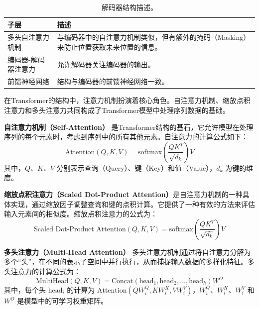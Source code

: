   \begin{table}[h!]
  \centering
  \small
  \begin{tabular}{lp{10cm}}
  \toprule
  \textbf{子层} & \textbf{描述} \\
  \midrule
  多头自注意力机制 & 与编码器中的自注意力机制类似，但有额外的掩码（Masking）来防止位置获取未来位置的信息。 \\
  \midrule
  编码器-解码器注意力 & 允许解码器关注编码器的输出。 \\
  \midrule
  前馈神经网络 & 结构与编码器的前馈神经网络一致。 \\
  \bottomrule
  \end{tabular}
  \caption{解码器结构描述。}
  \label{tab1:decoder}
  \end{table}

%
%
%
%
%
%

在Transformer的结构中，注意力机制扮演着核心角色。自注意力机制、缩放点积注意力和多头注意力共同构成了Transformer模型中处理序列数据的基础。

\textbf{自注意力机制（Self-Attention）}
是Transformer结构的基石，它允许模型在处理序列的每个元素时，考虑到序列中的所有其他元素。自注意力的计算公式如下：
\[ \text{Attention}(Q, K, V) = \text{softmax}\left(\frac{QK^T}{\sqrt{d_k}}\right)V \]
其中，\(Q\)、\(K\)、\(V\) 分别表示查询（Query）、键（Key）和值（Value），\(d_k\) 为键的维度。

\textbf{缩放点积注意力（Scaled Dot-Product Attention）}是自注意力机制的一种具体实现，通过缩放因子调整查询和键的点积计算。它提供了一种有效的方法来评估输入元素间的相似度。缩放点积注意力的公式为：
\[ \text{Scaled Dot-Product Attention}(Q, K, V) = \text{softmax}\left(\frac{QK^T}{\sqrt{d_k}}\right)V \]

\textbf{多头注意力（Multi-Head Attention）}
多头注意力机制通过将自注意力分解为多个``头''，在不同的表示子空间中并行执行，从而捕捉输入数据的多样化特征。多头注意力的计算公式为：
\[ \text{MultiHead}(Q, K, V) = \text{Concat}(\text{head}_1, \text{head}_2, \dots, \text{head}_h)W^O \]
其中，每个头 \(\text{head}_i\) 的计算为 \(\text{Attention}(QW_i^Q, KW_i^K, VW_i^V)\)，\(W_i^Q\)、\(W_i^K\)、\(W_i^V\) 和 \(W^O\) 是模型中的可学习权重矩阵。

